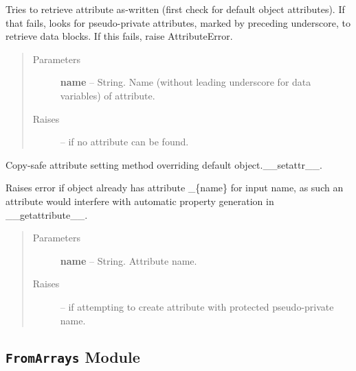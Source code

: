 \documentclass[letterpaper,10pt,english]{sphinxmanual}
\begin{document}
\begin{fulllineitems}
\begin{fulllineitems}
Tries to retrieve attribute as-written (first check for default object attributes).
If that fails, looks for pseudo-private attributes, marked by preceding underscore,
to retrieve data blocks.  If this fails, raise AttributeError.
\begin{quote}\begin{description}
\item[{Parameters }] \leavevmode
\textbf{name} --
String.  Name (without leading underscore for data variables) of attribute.

\item[{Raises }] \leavevmode
{} -- 
if no attribute can be found.

\end{description}\end{quote}

\end{fulllineitems}


\begin{fulllineitems}
\label{eqtools:eqtools.pfilereader.PFileReader.__setattr__}
Copy-safe attribute setting method overriding default object.\_\_setattr\_\_.

Raises error if object already has attribute \_\{name\} for input name,
as such an attribute would interfere with automatic property generation in
\_\_getattribute\_\_.
\begin{quote}\begin{description}
\item[{Parameters }] \leavevmode
\textbf{name} --
String.  Attribute name.

\item[{Raises }] \leavevmode
{} -- 
if attempting to create attribute with protected
pseudo-private name.

\end{description}\end{quote}

\end{fulllineitems}


\end{fulllineitems}



\subsection{\texttt{FromArrays} Module}
\label{eqtools:module-eqtools.FromArrays}\label{eqtools:fromarrays-module}
\end{document}
